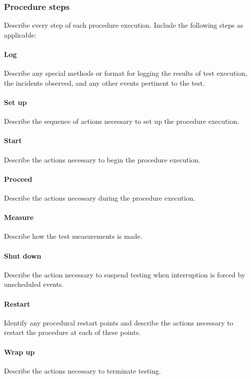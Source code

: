 \documentclass[CUx,lsstdraft,STS]{lsstdoc}
\begin{document}
\subsubsection{Procedure steps \label{sect:proc_steps}}
Describe every step of each procedure execution. Include the following steps as applicable:
\paragraph{Log \label{sect:proc_log}}
Describe any special methods or format for logging the results of test execution, the incidents observed, and any other events
pertinent to the test.
\paragraph{Set up \label{sect:proc_setup}}
Describe the sequence of actions necessary to set up the procedure execution.
\paragraph{Start \label{sect:proc_start}}
Describe the actions necessary to begin the procedure execution.
\paragraph{Proceed \label{sect:proc_proceed}}
Describe the actions necessary during the procedure execution.
\paragraph{Measure \label{sect:proc_measure}}
Describe how the test measurements is made.
\paragraph{Shut down \label{sect:proc_shutdown}}
Describe the action necessary to suspend testing when interruption is forced by unscheduled events.
\paragraph{Restart \label{sect:proc_restart}}
Identify any procedural restart points and describe the actions necessary to restart the procedure at each of these points.
\paragraph{Wrap up \label{sect:proc_wrapup}}
Describe the actions necessary to terminate testing.
\end{document}
